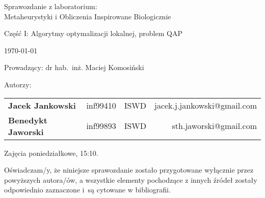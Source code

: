 \thispagestyle{empty} %

\begin{center}
{\large{Sprawozdanie z laboratorium:\\
Metaheurystyki i Obliczenia Inspirowane Biologicznie\\}}

\vspace{3ex}

Część I: Algorytmy optymalizacji lokalnej, problem QAP

\vspace{3ex}
{\footnotesize\today}

\end{center}


\vspace{10ex}

Prowadzący: dr hab.~inż. Maciej Komosiński

\vspace{5ex}

Autorzy:
\begin{tabular}{lllr}
\textbf{Jacek Jankowski} & inf99410 & ISWD & jacek.j.jankowski@gmail.com \\
\textbf{Benedykt Jaworski} & inf99893 & ISWD & sth.jaworski@gmail.com \\
\end{tabular}

\vspace{5ex}

Zajęcia poniedziałkowe, 15:10.

\vspace{35ex}

\noindent Oświadczam/y, że niniejsze sprawozdanie zostało przygotowane wyłącznie przez powyższych autora/ów,
a wszystkie elementy pochodzące z innych źródeł zostały odpowiednio zaznaczone i~są cytowane w bibliografii.  

\newpage

